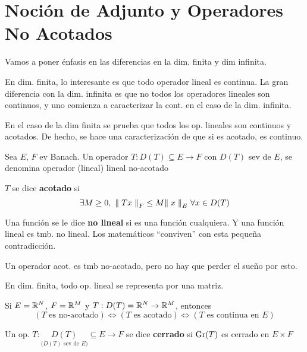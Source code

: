 \section*{Noción de Adjunto y Operadores No Acotados}

Vamos a poner énfasis en las diferencias en la dim. finita y dim infinita.

En dim. finita, lo interesante es que todo operador lineal es continua. La gran diferencia con la dim. infinita es que no todos los operadores lineales son continuos, y uno comienza a caracterizar la cont. en el caso de la dim. infinita.

En el caso de la dim finita se prueba que todos los op. lineales son continuos y acotados. De hecho, se hace una caracterización de que si es acotado, es continuo.

\begin{defn}
Sea $E$, $F$ ev Banach. Un operador $T: D(T) \subseteq E \to F$ con $D(T)$ sev de $E$, se denomina operador (lineal) lineal no-acotado
\end{defn}

\begin{defn}
$T$ se dice \textbf{acotado} si $$\exists M \geq 0, \ \norm[F]{Tx} \leq M \norm[E]{x} \ \forall x \in D(T)$$
\end{defn}

Una función se le dice \textbf{no lineal} si es una función cualquiera. Y una función lineal es tmb. no lineal. Los matemáticos ``conviven'' con esta pequeña contradicción.

\begin{note}
Un operador acot. es tmb no-acotado, pero no hay que perder el sueño por esto.
\end{note}

En dim. finita, todo op. lineal se representa por una matriz.

\begin{exer}
Si $E = \rr[N]$, $F = \rr[M]$ y $T:D(T) = \rr[N] \to \rr[M]$, entonces $$(T \text{ es no-acotado} )  \iff (T \text{ es acotado} ) \iff (T \text{ es continua en $E$} )$$
\end{exer}

\begin{defn}
Un op. $T: \underset{\text{($D(T)$ sev de $E$)}}{D(T)} \subseteq E \to F$ se dice \textbf{cerrado} si $ \gr (T)$ es cerrado en $E \times F$
\end{defn}

